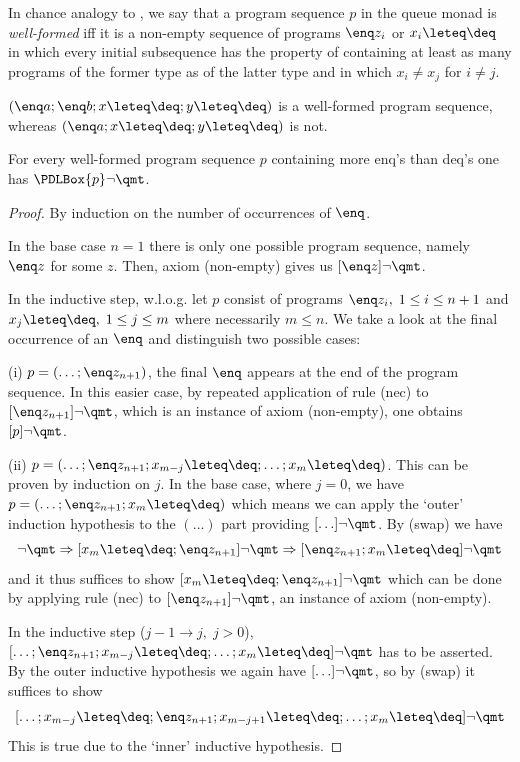 \begin{defn} In chance analogy to \cite{ClaessenHughes}, we say that a program
  sequence $p$ in the queue monad is \emph{well-formed} iff it is a non-empty
  sequence of programs $\enq z_i$ or $x_i\leteq \deq$ in which every initial
  subsequence has the property of containing at least as many programs of the
  former type as of the latter type and in which $x_i \neq x_j$ for $i \neq j$.
\end{defn}

\begin{expl}
$(\enq a; \enq b; x \leteq \deq; y \leteq \deq)$ is a well-formed program
  sequence, whereas $(\enq a; x\leteq \deq; y\leteq \deq)$ is not.
\end{expl}

\begin{thm}
\label{wf-empty}
 For every well-formed program sequence $p$ containing more enq's
than deq's one has $\PDLBox{p}\lnot \qmt$.
\end{thm}

\begin{proof} By induction on the number of occurrences of $\enq$.

In the base case $n=1$ there is only one possible program sequence, namely
$\enq z$ for some $z$. Then, axiom (non-empty) gives us $[\enq z]\lnot \qmt$.

In the inductive step, w.l.o.g. let $p$ consist of programs $\enq z_i,\; 1\leq i\leq
n+1$ and $x_j\leteq \deq,\;1\leq j\leq m$ where necessarily $m\leq n$. We take a look at the final
occurrence of an $\enq$ and distinguish two possible cases:

(i) $p =( \ldots; \enq z_{n+1})$, \IE the final $\enq$ appears at the end of the program
sequence. In this easier case, by repeated application of rule (nec) to $[\enq
z_{n+1}]\lnot \qmt$, which is an instance of axiom (non-empty), one obtains $[p]\lnot
\qmt$.

(ii) $p = (\ldots; \enq z_{n+1}; x_{m-j}\leteq \deq; \ldots; x_{m}\leteq \deq)$. This can be proven by
induction on $j$. In the base case, where $j=0$, we have $p = (\ldots; \enq z_{n+1};
x_{m}\leteq \deq)$ which means we can apply the `outer' induction hypothesis to the
$(\ldots)$ part providing $[\ldots]\lnot \qmt$. By (swap) we have 
\[
\lnot \qmt \Rightarrow [x_m\leteq \deq; \enq z_{n+1}]\lnot \qmt \Rightarrow [\enq z_{n+1}; x_m\leteq \deq]\lnot \qmt
\]
and
it thus suffices to show $[x_m\leteq \deq; \enq z_{n+1}]\lnot \qmt$ which can be done by
applying rule (nec) to $[\enq z_{n+1}]\lnot \qmt$, an instance of axiom (non-empty).

In the inductive step {\small ($j-1\to j,\;j>0$)},
$[\ldots; \enq z_{n+1}; x_{m-j}\leteq \deq; \ldots; x_{m}\leteq \deq]\lnot \qmt$ has to be asserted. By the
outer inductive hypothesis we again have  $[\ldots]\lnot \qmt$, so by (swap) it suffices
to show 
\[
[\ldots; x_{m-j}\leteq \deq; \enq z_{n+1}; x_{m-j+1}\leteq \deq; \ldots; x_{m}\leteq \deq]\lnot \qmt
\]
This is true due to the `inner' inductive hypothesis.
\end{proof}

